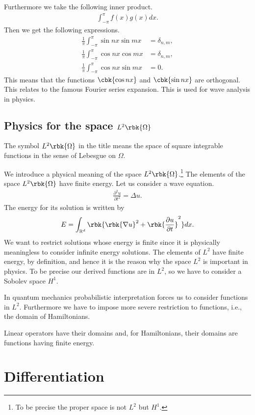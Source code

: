 \documentclass[openany, a4paper, oneside]{jsbook}
\begin{document}
Furthermore we take the following inner product.
\begin{align}
 \int_{- \pi}^{\pi} f(x) g(x) dx.
\end{align}
Then we get the following expressions.
\begin{align}
 \frac{1}{\pi} \int_{-\pi}^{\pi} \sin nx \sin mx
 &=
 \delta_{n,m}, \\
 \frac{1}{\pi} \int_{-\pi}^{\pi} \cos nx \cos mx
 &=
 \delta_{n,m}, \\
 \frac{1}{\pi} \int_{-\pi}^{\pi} \cos nx \sin mx
 &= 0.
\end{align}
This means that the functions $\cbk{\cos nx}$ and $\cbk{\sin nx}$ are orthogonal.
This relates to the famous Fourier series expansion.
This is used for wave analysis in physics.
\subsection{Physics for the space $L^2 \rbk{\Omega}$}

The symbol $L^2 \rbk{\Omega}$ in the title means
the space of square integrable functions in the sense of Lebesgue on $\Omega$.

We introduce a physical meaning of the space $L^2 \rbk{\Omega}$.\footnote{To be precise the proper space is not $L^2$ but $H^1$.}
The elements of the space $L^2 \rbk{\Omega}$ have finite energy.
Let us consider a wave equation.
\begin{align}
 \frac{\partial^2 u}{\partial t^2}
 =
 \Delta u.
\end{align}
The energy for its solution is written by
\begin{align}
 E
 =
 \int_{\mathbb{R}^d} \rbk{\rbk{\nabla u}^2 + \rbk{\frac{\partial u}{\partial t}}^2}dx.
\end{align}
We want to restrict solutions whose energy is finite
since it is physically meaningless to consider infinite energy solutions.
The elements of $L^2$ have finite energy, by definition,
and hence it is the reason why the space $L^2$ is important in physics.
To be precise our derived functions are in $L^2$, so
we have to consider a Sobolev space $H^1$.

In quantum mechanics probabilistic interpretation forces us to
consider functions in $L^2$.
Furthermore we have to impose more severe restriction to functions,
i.e., the domain of Hamiltonians.

Linear operators have their domains
and, for Hamiltonians, their domains are functions having finite energy.
\section{Differentiation}
\end{document}
